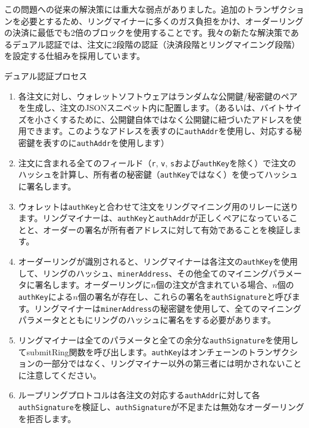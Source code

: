 \documentclass{article}
\begin{document}
\begin{multicols}{2}
この問題への従来の解決策には重大な弱点がありました。追加のトランザクションを必要とするため、リングマイナーに多くのガス負担をかけ、オーダーリングの決済に最低でも2倍のブロックを使用することです。我々の新たな解決策であるデュアル認証\cite{dualauthor}では、注文に2段階の認証（決済段階とリングマイニング段階）を設定する仕組みを採用しています。

デュアル認証プロセス

\begin{enumerate}

	\item 各注文に対し、ウォレットソフトウェアはランダムな公開鍵/秘密鍵のペアを生成し、注文のJSONスニペット内に配置します。（あるいは、バイトサイズを小さくするために、公開鍵自体ではなく公開鍵に紐づいたアドレスを使用できます。このようなアドレスを表すのに\verb|authAddr|を使用し、対応する秘密鍵を表すのに\verb|authAddr|を使用します）

	\item 注文に含まれる全てのフィールド（\verb|r|, \verb|v|, \verb|s|および\verb|authKey|を除く）で注文のハッシュを計算し、所有者の秘密鍵（\verb|authKey|ではなく）を使ってハッシュに署名します。

	\item ウォレットは\verb|authKey|と合わせて注文をリングマイニング用のリレーに送ります。リングマイナーは、\verb|authKey|と\verb|authAddr|が正しくペアになっていることと、オーダーの署名が所有者アドレスに対して有効であることを検証します。

	\item オーダーリングが識別されると、リングマイナーは各注文の\verb|authKey|を使用して、リングのハッシュ、\verb|minerAddress|、その他全てのマイニングパラメータに署名します。オーダーリングに$n$個の注文が含まれている場合、$n$個の\verb|authKey|による$n$個の署名が存在し、これらの署名を\verb|authSignature|と呼びます。リングマイナーは\verb|minerAddress|の秘密鍵を使用して、全てのマイニングパラメータとともにリングのハッシュに署名をする必要があります。

	\item リングマイナーは全てのパラメータと全ての余分な\verb|authSignature|を使用してsubmitRing関数を呼び出します。\verb|authKey|はオンチェーンのトランザクションの一部分ではなく、リングマイナー以外の第三者には明かされないことに注意してください。

	\item ループリングプロトコルは各注文の対応する\verb|authAddr|に対して各\verb|authSignature|を検証し、\verb|authSignature|が不足または無効なオーダーリングを拒否します。
 

\end{enumerate}
\end{multicols}
\end{document}
